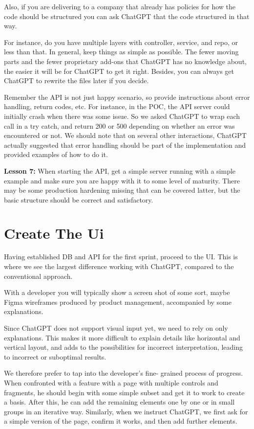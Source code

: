\documentclass[runningheads]{llncs}
\begin{document}
Also, if you are delivering to a company that already has policies for how the code should be structured you can ask ChatGPT that the code structured in that way.

For instance, do you have multiple layers with controller, service, and repo, or less than that. In general, keep things as simple as possible. The fewer moving parts and the fewer proprietary add-ons that ChatGPT has no knowledge about, the easier it will be for ChatGPT to get it right. Besides, you can always get ChatGPT to rewrite the 
files later if you decide.

Remember the API is not just happy scenario, so provide instructions about error handling, return codes, etc. For instance, in the POC, the API server could initially crash when there was some issue. So we asked ChatGPT to wrap each call in a try catch, and return 200 or 500 depending on whether an error was encountered or not. We should note that on several other interactions, ChatGPT actually suggested that error handling should be part of the implementation and provided examples of how to do it.

\textbf{Lesson 7:} When starting the API, get a simple server running with a simple example and make sure you are happy with it to some level of maturity. There may be some production hardening missing that can be covered latter, but the basic structure should be correct and satisfactory.

\section{Create The Ui}
Having established DB and API for the first sprint, proceed to the UI. This is where we see the largest difference working with ChatGPT, compared to the conventional approach.

With a developer you will typically show a screen shot of some sort, maybe Figma wireframes produced by product management, accompanied by some explanations.

Since ChatGPT does not support visual input yet, we need to rely on only explanations. This makes it more difficult to explain details like horizontal and vertical layout, and adds to the possibilities for incorrect interpretation, leading to incorrect or suboptimal results.

We therefore prefer to tap into the developer's fine- grained process of progress. When confronted with a feature with a page with multiple controls and fragments, he should begin with some simple subset and get it to work to create a basis. After this, he can add the remaining elements one by one or in small groups in an iterative way.
Similarly, when we instruct ChatGPT, we first ask for a simple version of the page, confirm it works, and then add further elements.
\end{document}
